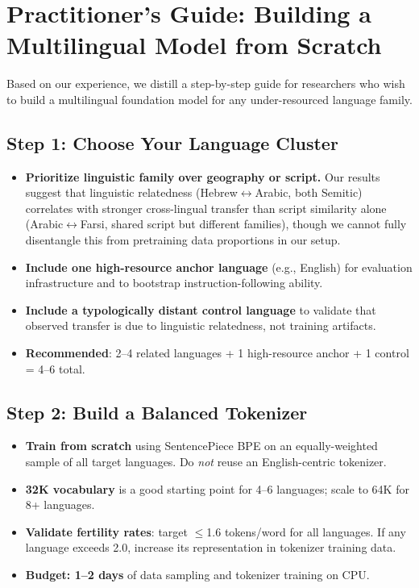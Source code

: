 \documentclass[10pt,twocolumn]{article}
\begin{document}
\section{Practitioner's Guide: Building a Multilingual Model from Scratch}
\label{sec:guide}

Based on our experience, we distill a step-by-step guide for researchers who wish to build a multilingual foundation model for any under-resourced language family.

\subsection{Step 1: Choose Your Language Cluster}

\begin{itemize}
    \item \textbf{Prioritize linguistic family over geography or script.} Our results suggest that linguistic relatedness (Hebrew$\leftrightarrow$Arabic, both Semitic) correlates with stronger cross-lingual transfer than script similarity alone (Arabic$\leftrightarrow$Farsi, shared script but different families), though we cannot fully disentangle this from pretraining data proportions in our setup.
    \item \textbf{Include one high-resource anchor language} (e.g., English) for evaluation infrastructure and to bootstrap instruction-following ability.
    \item \textbf{Include a typologically distant control language} to validate that observed transfer is due to linguistic relatedness, not training artifacts.
    \item \textbf{Recommended}: 2--4 related languages + 1 high-resource anchor + 1 control = 4--6 total.
\end{itemize}

\subsection{Step 2: Build a Balanced Tokenizer}

\begin{itemize}
    \item \textbf{Train from scratch} using SentencePiece BPE on an equally-weighted sample of all target languages. Do \emph{not} reuse an English-centric tokenizer.
    \item \textbf{32K vocabulary} is a good starting point for 4--6 languages; scale to 64K for 8+ languages.
    \item \textbf{Validate fertility rates}: target $\leq$1.6 tokens/word for all languages. If any language exceeds 2.0, increase its representation in tokenizer training data.
    \item \textbf{Budget: 1--2 days} of data sampling and tokenizer training on CPU.
\end{itemize}
\end{document}
